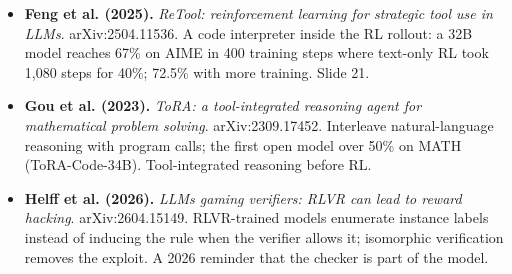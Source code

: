\begin{itemize}[leftmargin=1.2em,itemsep=3pt]
\item \textbf{Feng et al. (2025).} \textit{ReTool: reinforcement learning for strategic tool use in LLMs}. arXiv:2504.11536. A code interpreter inside the RL rollout: a 32B model reaches 67\% on AIME in 400 training steps where text-only RL took 1,080 steps for 40\%; 72.5\% with more training. Slide 21.
\item \textbf{Gou et al. (2023).} \textit{ToRA: a tool-integrated reasoning agent for mathematical problem solving}. arXiv:2309.17452. Interleave natural-language reasoning with program calls; the first open model over 50\% on MATH (ToRA-Code-34B). Tool-integrated reasoning before RL.
\item \textbf{Helff et al. (2026).} \textit{LLMs gaming verifiers: RLVR can lead to reward hacking}. arXiv:2604.15149. RLVR-trained models enumerate instance labels instead of inducing the rule when the verifier allows it; isomorphic verification removes the exploit. A 2026 reminder that the checker is part of the model.
\end{itemize}
